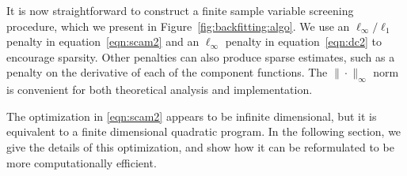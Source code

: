 
It is now straightforward to construct a finite sample variable screening procedure, which we present in Figure~\ref{fig:backfitting:algo}.
We use an $\ell_\infty/\ell_1$ penalty in equation~\eqref{eqn:scam2}
and an $\ell_\infty$ penalty in equation~\eqref{eqn:dc2} to encourage
sparsity.  Other penalties can also produce
sparse estimates, such as a penalty on the derivative of each of the
component functions.  The $\|\cdot\|_\infty$ norm is convenient for both
theoretical analysis and implementation.

The optimization in \eqref{eqn:scam2} appears to be infinite
dimensional, but it is equivalent to a finite dimensional quadratic
program.  In the following section, we give the details
of this optimization, and show how it can be reformulated
to be more computationally efficient.

